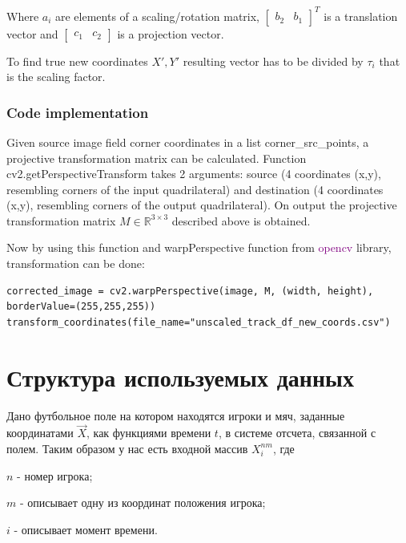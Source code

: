 Where $a_i$ are elements of a scaling/rotation matrix, $\begin{bmatrix}
    b_2 & b_1
\end{bmatrix}^T$ is a translation vector and $\begin{bmatrix}
    c_1 & c_2
\end{bmatrix}$ is a projection vector.

To find true new coordinates $X', Y'$ resulting vector has to be divided by $\tau_i$ that is the scaling factor. 

\subsubsection{Code implementation}

Given source image field corner coordinates in a list corner\_src\_points, a projective transformation matrix can be calculated. Function cv2.getPerspectiveTransform takes 2 arguments: source (4 coordinates (x,y), resembling corners of the input quadrilateral) and destination (4 coordinates (x,y), resembling corners of the output quadrilateral). On output the projective transformation matrix $M \in \mathbb{R}^{3 \times 3}$ described above is obtained.



Now by using this function and warpPerspective function from \textcolor{purple}{opencv} library, transformation can be done:
\begin{lstlisting}
corrected_image = cv2.warpPerspective(image, M, (width, height), borderValue=(255,255,255))
transform_coordinates(file_name="unscaled_track_df_new_coords.csv")
\end{lstlisting}


\section{Структура используемых данных}

Дано футбольное поле на котором находятся игроки и мяч, заданные координатами $\vec X$, как функциями времени $t$,  в системе отсчета, связанной с полем. Таким образом у нас есть входной массив $X^{nm}_i$, где 

$n$ - номер игрока;

$m$ - описывает одну из координат положения игрока;

$i$ - описывает момент времени. 

